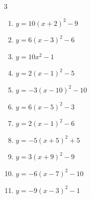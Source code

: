 \begin{multicols}{3}
\begin{enumerate}
        \phantom{$\displaystyle 頂点\left( 2 , 6 \right)$}

  \item $\displaystyle y=10\left( x+2\right)^{2}-9$

        \phantom{$\displaystyle 頂点\left( -2 , -9 \right)$}

  \item $\displaystyle y=6\left( x-3\right)^{2}-6$

        \phantom{$\displaystyle 頂点\left( 3 , -6 \right)$}

  \item $\displaystyle y=10x^{2}-1$

        \phantom{$\displaystyle 頂点\left( 0 , -1 \right)$}

  \item $\displaystyle y=2\left( x-1\right)^{2}-5$

        \phantom{$\displaystyle 頂点\left( 1 , -5 \right)$}

\columnbreak %

  \item $\displaystyle y=-3\left( x-10\right)^{2}-10$

        \phantom{$\displaystyle 頂点\left( 10 , -10 \right)$}

  \item $\displaystyle y=6\left( x-5\right)^{2}-3$

        \phantom{$\displaystyle 頂点\left( 5 , -3 \right)$}

  \item $\displaystyle y=2\left( x-1\right)^{2}-6$

        \phantom{$\displaystyle 頂点\left( 1 , -6 \right)$}

  \item $\displaystyle y=-5\left( x+5\right)^{2}+5$

        \phantom{$\displaystyle 頂点\left( -5 , 5 \right)$}

  \item $\displaystyle y=3\left( x+9\right)^{2}-9$

        \phantom{$\displaystyle 頂点\left( -9 , -9 \right)$}

  \item $\displaystyle y=-6\left( x-7\right)^{2}-10$

        \phantom{$\displaystyle 頂点\left( 7 , -10 \right)$}

  \item $\displaystyle y=-9\left( x-3\right)^{2}-1$


\end{enumerate}
\end{multicols}
